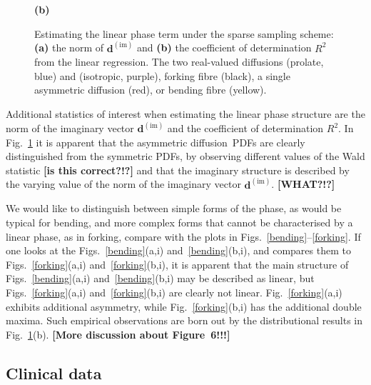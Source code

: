\documentclass[authoryear,preprint,12pt]{elsarticle}
\newcommand{\bd}{\mathbf{d}}
\begin{document}
\begin{figure}[tbp]
\begin{center}
\begin{minipage}[]{0.45\textwidth}
      \textbf{(b)}
    \end{minipage}
  \end{center}
  \caption{Estimating the linear phase term under the sparse sampling
    scheme: \textbf{(a)} the norm of $\bd^{(\text{im})}$ and
    \textbf{(b)} the coefficient of determination $R^2$ from the
    linear regression.  The two real-valued diffusions (prolate, blue)
    and (isotropic, purple), forking fibre (black), a single
    asymmetric diffusion (red), or bending fibre (yellow).}
  \label{fig-1} 
\end{figure}

Additional statistics of interest when estimating the linear phase
structure are the norm of the imaginary vector $\bd^{(\text{im})}$ and
the coefficient of determination $R^2$.  In Fig.~\ref{fig-1} it is
apparent that the asymmetric diffusion~PDFs are clearly distinguished
from the symmetric PDFs, by observing different values of the Wald
statistic \textbf{[is this correct?!?]} and that the imaginary
structure is described by the varying value of the norm of the
imaginary vector $\bd^{(\text{im})}$.  \textbf{[WHAT?!?]}

We would like to distinguish between simple forms of the phase, as
would be typical for bending, and more complex forms that cannot be
characterised by a linear phase, as in forking, compare with the plots
in Figs.~\ref{bending}--\ref{forking}.  If one looks at the
Figs.~\ref{bending}(a,i) and~\ref{bending}(b,i), and compares them to
Figs.~\ref{forking}(a,i) and~\ref{forking}(b,i), it is apparent that
the main structure of Figs.~\ref{bending}(a,i) and~\ref{bending}(b,i)
may be described as linear, but Figs.~\ref{forking}(a,i)
and~\ref{forking}(b,i) are clearly not linear.
Fig.~\ref{forking}(a,i) exhibits additional asymmetry, while
Fig.~\ref{forking}(b,i) has the additional double maxima.  Such
empirical observations are born out by the distributional results in
Fig.~\ref{fig-1}(b).  \textbf{[More discussion about Figure~6!!!]}

\subsection{Clinical data}
\end{document}
